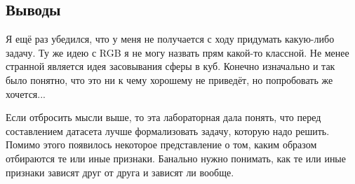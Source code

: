 \documentclass[12pt]{article}
\begin{document}
	\subsection*{Выводы}
	
	Я ещё раз убедился, что у меня не получается с ходу придумать какую-либо задачу. Ту же идею с RGB я не могу назвать прям какой-то классной. Не менее странной является идея засовывания сферы в куб. Конечно изначально и так было понятно, что это ни к чему хорошему не приведёт, но попробовать же хочется...
	
	Если отбросить мысли выше, то эта лабораторная дала понять, что перед составлением датасета лучше формализовать задачу, которую надо решить. Помимо этого появилось некоторое представление о том, каким образом отбираются те или иные признаки. Банально нужно понимать, как те или иные признаки зависят друг от друга и зависят ли вообще.
	
\end{document}
